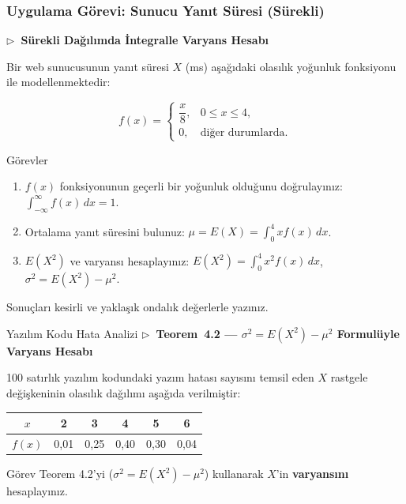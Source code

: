 \documentclass[light]{lutbeamer}
\begin{document}
\begin{frame}[fragile]
  \frametitle{Uygulama Görevi: Sunucu Yanıt Süresi (Sürekli)}
  \textbf{\small $\triangleright$~Sürekli Dağılımda İntegralle Varyans Hesabı}

  \smallskip
  \small
  Bir web sunucusunun yanıt süresi $X$ (ms) aşağıdaki olasılık yoğunluk fonksiyonu ile modellenmektedir:

  \[
    f(x) =
    \begin{cases}
      \dfrac{x}{8}, & 0 \le x \le 4, \\
      0,            & \text{diğer durumlarda.}
    \end{cases}
  \]

  \begin{block}{Görevler}
    \footnotesize
    \begin{enumerate}
      \item $f(x)$ fonksiyonunun geçerli bir yoğunluk olduğunu doğrulayınız: $\int_{-\infty}^{\infty} f(x)\,dx = 1$.
      \item Ortalama yanıt süresini bulunuz: $\mu = E(X) = \int_{0}^{4} x f(x)\,dx$.
      \item $E(X^2)$ ve varyansı hesaplayınız: $E(X^2) = \int_{0}^{4} x^2 f(x)\,dx$, $\sigma^2 = E(X^2) - \mu^2$.
    \end{enumerate}
  \end{block}

  \footnotesize
  Sonuçları kesirli ve yaklaşık ondalık değerlerle yazınız.
\end{frame}

\begin{frame}{Yazılım Kodu Hata Analizi}
  \textbf{\small $\triangleright$~Teorem~4.2 --- $\sigma^2 = E(X^2) - \mu^2$ Formulüyle Varyans Hesabı}

  \smallskip
  \small
  100 satırlık yazılım kodundaki yazım hatası sayısını temsil eden $X$ rastgele değişkeninin olasılık dağılımı aşağıda verilmiştir:

  \medskip
  \begin{center}
    \renewcommand{\arraystretch}{1.2}
    \begin{tabular}{cccccc}
      \toprule
      $x$ & 2 & 3 & 4 & 5 & 6 \\
      \midrule
      $f(x)$ & 0{,}01 & 0{,}25 & 0{,}40 & 0{,}30 & 0{,}04 \\
      \bottomrule
    \end{tabular}
  \end{center}

  \medskip
  \begin{block}{Görev}
    Teorem 4.2'yi ($\sigma^2 = E(X^2) - \mu^2$) kullanarak $X$'in \textbf{varyansını} hesaplayınız.
  \end{block}
\end{frame}
\end{document}
